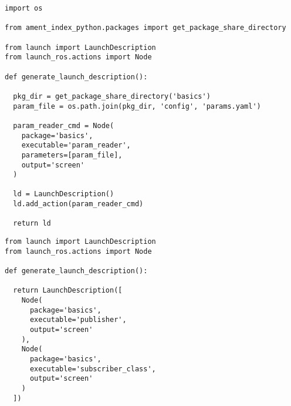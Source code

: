  \footnotesize
\begin{tcolorbox}[sharp corners, colframe=gray!80, colback=LightGray, left=0pt, top=0pt, bottom=0pt, title=\texttt{br2\_basics/launch/param\_node\_v2\_launch.py}]
  \begin{verbatim}
import os

from ament_index_python.packages import get_package_share_directory

from launch import LaunchDescription
from launch_ros.actions import Node

def generate_launch_description():

  pkg_dir = get_package_share_directory('basics')
  param_file = os.path.join(pkg_dir, 'config', 'params.yaml')

  param_reader_cmd = Node(
    package='basics',
    executable='param_reader',
    parameters=[param_file],
    output='screen'
  )
  
  ld = LaunchDescription()
  ld.add_action(param_reader_cmd)

  return ld
    \end{verbatim}
    \end{tcolorbox}
  \normalsize

 \footnotesize
\begin{tcolorbox}[sharp corners, colframe=gray!80, colback=LightGray, left=0pt, top=0pt, bottom=0pt, title=\texttt{br2\_basics/launch/pub\_sub\_v2\_launch.py}]
  \begin{verbatim}
from launch import LaunchDescription
from launch_ros.actions import Node

def generate_launch_description():
  
  return LaunchDescription([
    Node(
      package='basics',
      executable='publisher',
      output='screen'
    ),
    Node(
      package='basics',
      executable='subscriber_class',
      output='screen'
    )
  ])
    \end{verbatim}
    \end{tcolorbox}
  \normalsize

